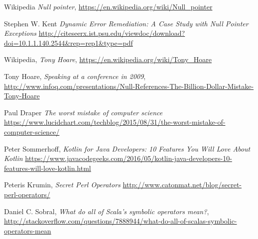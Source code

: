 \documentclass[a4paper,12pt]{article}
\begin{document}
\begin{thebibliography}{56}
	
    Wikipedia
    \textit{Null pointer},
    \url{https://en.wikipedia.org/wiki/Null_pointer}

    Stephen W. Kent
    \textit{Dynamic Error Remediation: A Case Study with Null Pointer Exceptions}
    \url{http://citeseerx.ist.psu.edu/viewdoc/download?doi=10.1.1.140.2544&rep=rep1&type=pdf}

	Wikipedia,
	\textit{Tony Hoare},
	\url{https://en.wikipedia.org/wiki/Tony_Hoare}
	
	Tony Hoare,
	\textit{Speaking at a conference in 2009},
	\url{http://www.infoq.com/presentations/Null-References-The-Billion-Dollar-Mistake-Tony-Hoare}

    Paul Draper
    \textit{The worst mistake of computer science}
    \url{https://www.lucidchart.com/techblog/2015/08/31/the-worst-mistake-of-computer-science/}

 	Peter Sommerhoff,
 	\textit{Kotlin for Java Developers: 10 Features You Will Love About Kotlin}
 	\url{https://www.javacodegeeks.com/2016/05/kotlin-java-developers-10-features-will-love-kotlin.html}

	Peteris Krumin,
	\textit{Secret Perl Operators}
	\url{http://www.catonmat.net/blog/secret-perl-operators/}

	Daniel C. Sobral,
	\textit{What do all of Scala's symbolic operators mean?},
	\url{http://stackoverflow.com/questions/7888944/what-do-all-of-scalas-symbolic-operators-mean}

\end{thebibliography}
\end{document}
